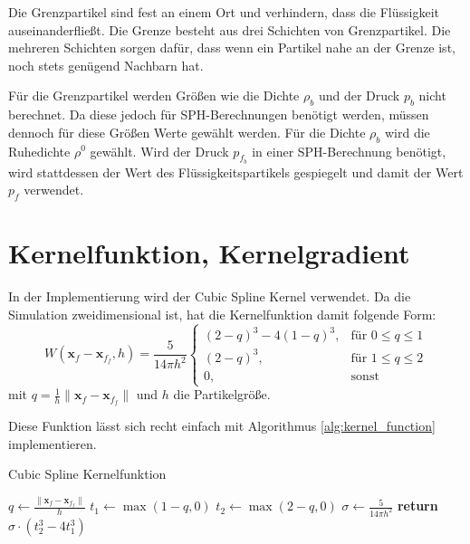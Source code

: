 \documentclass{scrreprt}
\begin{document}
Die Grenzpartikel sind fest an einem Ort und verhindern, dass die Flüssigkeit auseinanderfließt.
Die Grenze besteht aus drei Schichten von Grenzpartikel.
Die mehreren Schichten sorgen dafür, dass wenn ein Partikel nahe an der Grenze ist, noch stets genügend Nachbarn hat.

Für die Grenzpartikel werden Größen wie die Dichte $\rho_b$ und der Druck $p_b$ nicht berechnet.
Da diese jedoch für SPH-Berechnungen benötigt werden, müssen dennoch für diese Größen Werte gewählt werden.
Für die Dichte $\rho_b$ wird die Ruhedichte $\rho^0$ gewählt.
Wird der Druck $p_{f_b}$ in einer SPH-Berechnung benötigt, wird stattdessen der Wert des Flüssigkeitspartikels gespiegelt und damit der Wert $p_f$ verwendet.


\section{Kernelfunktion, Kernelgradient}
In der Implementierung wird der Cubic Spline Kernel verwendet.
Da die Simulation zweidimensional ist, hat die Kernelfunktion damit folgende Form:
\begin{equation}
    W(\textbf{x}_f - \textbf{x}_{f_f}, h) = \frac{5}{14\pi h^2} \begin{cases}
        (2-q)^3 - 4(1-q)^3, &\text{für } 0 \leq q \leq 1\\
        (2-q)^3, &\text{für } 1 \leq q \leq 2\\
        0, &\text{sonst}
    \end{cases}
\end{equation}
mit $q = \frac{1}{h}\|\textbf{x}_f - \textbf{x}_{f_f}\|$ und $h$ die Partikelgröße.

Diese Funktion lässt sich recht einfach mit Algorithmus \ref{alg:kernel_function} implementieren.
\begin{algorithm}
    \caption{Cubic Spline Kernelfunktion}
    \label{alg:kernel_function}
    \begin{algorithmic}[1]
            \State $q \gets \frac{\|\textbf{x}_f - \textbf{x}_{f_f}\|}{h}$
            \State $t_1 \gets \max(1 - q, 0)$
            \State $t_2 \gets \max(2 - q, 0)$
            \State $\sigma \gets \frac{5}{14 \pi h^2}$
            \State \textbf{return} $\sigma \cdot (t_2^3 - 4t_1^3)$
        \EndFunction
    \end{algorithmic}
\end{algorithm}
\end{document}
